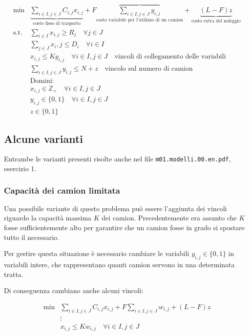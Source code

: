 \begin{align*}
\min &\underbrace{\sum\limits_{i \in I, j \in J} C_{i,j} x_{i,j}}_{\text{costo fisso di trasporto}}+ F \overbrace{
\sum\limits_{i \in I, j \in J} y_{i,j}}_{\text{costo variabile per l'utilizzo di un camion}} + \underbrace{(L-F)z}_{\text{costo extra del noleggio}} \\
\text{s.t. }&\sum\limits_{i \in I} x_{i,j} \geq R_j \quad\forall j \in J\\
&\sum\limits_{j \in J} x_i,j \leq D_i \quad\forall i \in I \\
&x_{i,j} \leq K y_{i,j} \quad\forall i \in I, j \in J \quad\text{vincoli di collegamento delle variabili}\\
&\sum\limits_{i \in I, j \in J} y_{i,j} \leq N + z \quad\text{vincolo sul numero di camion}\\ 
&\text{Domini:} \\
&x_{i,j} \in \mathbb{Z}_+  \quad\forall i \in I, j \in J  \\
&y_{i,j} \in \{0,1\}  \quad\forall i \in I, j \in J  \\
&z \in \{0,1\}
\end{align*}

\subsection{Alcune varianti}

Entrambe le varianti presenti risolte anche nel file \texttt{m01.modelli.00.en.pdf}, esercizio 1.

\subsubsection{Capacità dei camion limitata}

Una possibile variante di questo problema può essere l'aggiunta dei vincoli riguardo la capacità massima $K$ dei camion. Precedentemente era assunto che $K$ fosse sufficientemente alto per garantire che un camion fosse in grado si spostare tutto il necessario.

Per gestire questa situazione è necessario cambiare le variabili $y_{i,j} \in \{0,1\}$ in variabili intere, che rappresentano quanti camion servono in una determinata tratta.

Di conseguenza cambiano anche alcuni vincoli:

\begin{align*}
	\min &\sum\limits_{i \in I, j \in J} C_{i,j} x_{i,j} + F \sum\limits_{i \in I, j \in J} w_{i,j}+ (L-F)z \\
	&\vdots \\
	&x_{i,j} \leq K w_{i,j} \quad\forall i \in I, j \in J 
\end{align*}

